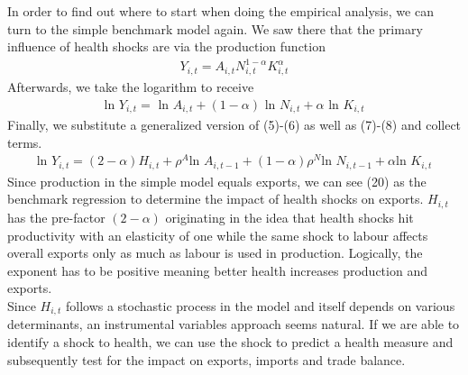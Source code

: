 \documentclass{article}
\begin{document}
In order to find out where to start when doing the empirical analysis, we can turn to the simple benchmark model again. We saw there that the primary influence of health shocks are via the production function
\begin{align*}
Y_{i, t} = A_{i, t} N_{i, t}^{1 - \alpha} K_{i, t}^{\alpha}
\end{align*}
Afterwards, we take the logarithm to receive
\begin{align*}
\text{ln } Y_{i, t} = \text{ ln } A_{i, t} + (1 - \alpha) \text{ ln } N_{i, t} + \alpha \text{ ln } K_{i, t}
\end{align*}
Finally, we substitute a generalized version of (5)-(6) as well as (7)-(8) and collect terms.
\begin{align}
\text{ln } Y_{i, t} = (2 - \alpha)H_{i, t} + \rho^A \text{ln } A_{i, t-1} + (1 - \alpha) \rho^N \text{ln } N_{i, t-1} + \alpha \text{ln } K_{i, t}
\end{align}
Since production in the simple model equals exports, we can see (20) as the benchmark regression to determine the impact of health shocks on exports. $H_{i, t}$ has the pre-factor $(2 - \alpha)$ originating in the idea that health shocks hit productivity with an elasticity of one while the same shock to labour affects overall exports only as much as labour is used in production. Logically, the exponent has to be positive meaning better health increases production and exports. \\
Since $H_{i, t}$ follows a stochastic process in the model and itself depends on various determinants, an instrumental variables approach seems natural. If we are able to identify a shock to health, we can use the shock to predict a health measure and subsequently test for the impact on exports, imports and trade balance. \\
\end{document}
